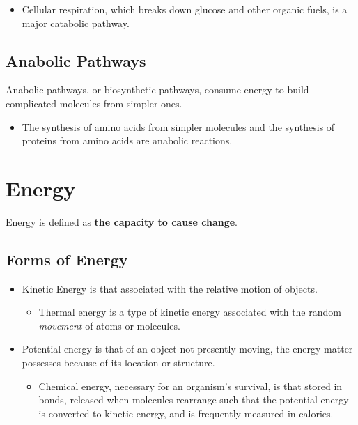 \documentclass[a4paper]{article}
\begin{document}
\begin{itemize}
	\item Cellular respiration, which breaks down glucose and other organic fuels, is a major catabolic pathway.
\end{itemize}

\subsection{Anabolic Pathways}
\color{red}Anabolic pathways\color{black}, or biosynthetic pathways, consume energy to build complicated molecules from simpler ones.

\begin{itemize}
	\item The synthesis of amino acids from simpler molecules and the synthesis of proteins from amino acids are anabolic reactions.
\end{itemize}

\section{Energy}
\color{red}Energy \color{black} is defined as \textbf{the capacity to cause change}.

\subsection{Forms of Energy}
\begin{itemize}
	\item \color{red}Kinetic Energy \color{black} is that associated with the relative motion of objects.
		\begin{itemize}
			\item Thermal energy is a type of kinetic energy associated with the random \textit{movement} of atoms or molecules.
		\end{itemize}
	\item \color{red}Potential energy \color{black} is that of an object not presently moving, the energy matter possesses because of its location or structure.
		\begin{itemize}
			\item Chemical energy, necessary for an organism's survival, is that stored in bonds, released when molecules rearrange such that the potential energy is converted to kinetic energy, and is frequently measured in calories.
		\end{itemize}
\end{itemize}
\end{document}
